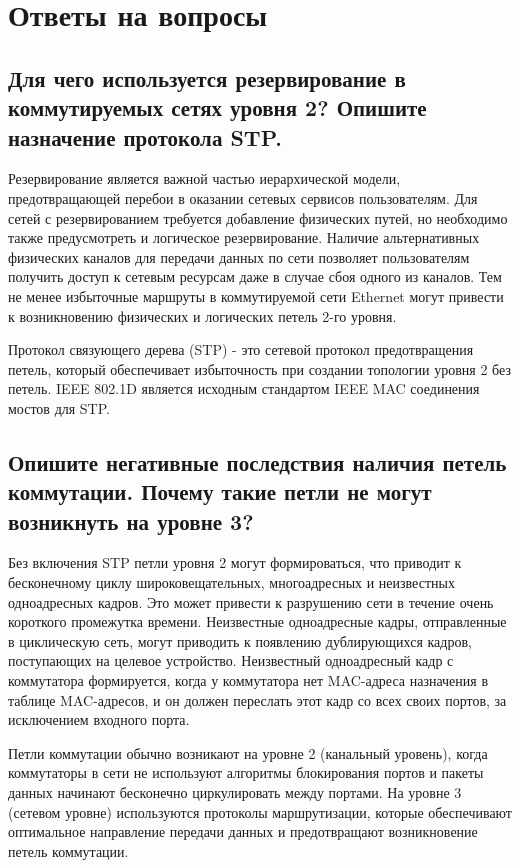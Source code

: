 \section{Ответы на вопросы}

\subsection{Для чего используется резервирование в коммутируемых сетях уровня 2? Опишите назначение
протокола STP.}

Резервирование является важной частью иерархической модели,
предотвращающей перебои в оказании сетевых сервисов пользователям. Для
сетей с резервированием требуется добавление физических путей, но
необходимо также предусмотреть и логическое резервирование. Наличие
альтернативных физических каналов для передачи данных по сети позволяет
пользователям получить доступ к сетевым ресурсам даже в случае сбоя
одного из каналов. Тем не менее избыточные маршруты в коммутируемой
сети Ethernet могут привести к возникновению физических и логических
петель 2-го уровня.

Протокол связующего дерева (STP) - это сетевой протокол
предотвращения петель, который обеспечивает избыточность при создании
топологии уровня 2 без петель. IEEE 802.1D является исходным стандартом
IEEE MAC соединения мостов для STP.


\subsection{Опишите негативные последствия наличия петель коммутации.
Почему такие петли не могут возникнуть на уровне 3?}

Без включения STP петли уровня 2 могут формироваться, что приводит
к бесконечному циклу широковещательных, многоадресных и неизвестных
одноадресных кадров. Это может привести к разрушению сети в течение
очень короткого промежутка времени.
Неизвестные одноадресные кадры, отправленные в циклическую сеть,
могут приводить к появлению дублирующихся кадров, поступающих на
целевое устройство. Неизвестный одноадресный кадр с коммутатора
формируется, когда у коммутатора нет MAC-адреса назначения в таблице
MAC-адресов, и он должен переслать этот кадр со всех своих портов, за
исключением входного порта.

Петли коммутации обычно возникают на уровне 2 (канальный
уровень), когда коммутаторы в сети не используют алгоритмы блокирования
портов и пакеты данных начинают бесконечно циркулировать между
портами. На уровне 3 (сетевом уровне) используются протоколы
маршрутизации, которые обеспечивают оптимальное направление передачи
данных и предотвращают возникновение петель коммутации.


